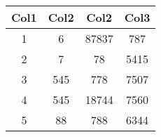 \documentclass{article}
\begin{document}
\begin{tabular}{|c|c|c|c|}
\hline
Col1 & Col2 & Col2 & Col3\\
\hline
1 & 6 & 87837 & 787\\
\hline
2 & 7 & 78 & 5415\\
\hline
3 & 545 & 778 & 7507\\
\hline
4 & 545 & 18744 & 7560\\
\hline
5 & 88 & 788 & 6344\\
\hline

\end{tabular}
\end{document}
